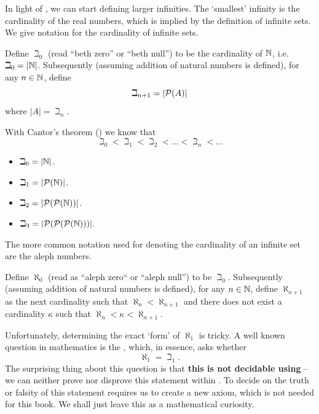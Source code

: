 In light of , we can start defining larger infinities. The `smallest' infinity is the cardinality of the real numbers, which is implied by the definition of infinite sets. We give notation for the cardinality of infinite sets.

\begin{definition}
    Define $\beth_0$ (read ``beth zero'' or ``beth null'') to be the cardinality of $\mathbb{N}$, i.e. $\beth_0 = |\mathbb{N}|$. Subsequently (assuming addition of natural numbers is defined), for any $n \in \mathbb{N}$, define
    \[
        \beth_{n+1} = |{\mathcal{P}(A)}|
    \]
    where $|A| = \beth_n$.
\end{definition}

With Cantor's theorem () we know that
\[
    \beth_0 < \beth_1 < \beth_2 < \dots < \beth_n < \dots
\]

\begin{example}
    \begin{itemize}[leftmargin=*]
        \item $\beth_0 = |\mathbb{N}|$.
        \item $\beth_1 = |{\mathcal{P}(\mathbb{N})}|$.
        \item $\beth_2 = |{\mathcal{P}({\mathcal{P}(\mathbb{N})})}|$.
        \item $\beth_3 = |{\mathcal{P}({\mathcal{P}({\mathcal{P}(\mathbb{N})})})}|$.
    \end{itemize}
\end{example}

The more common notation used for denoting the cardinality of an infinite set are the aleph numbers.

\begin{definition}
    Define $\aleph_0$ (read as ``aleph zero`` or ``aleph null'') to be $\beth_0$. Subsequently (assuming addition of natural numbers is defined), for any $n \in \mathbb{N}$, define $\aleph_{n+1}$ as the next cardinality such that $\aleph_n < \aleph_{n+1}$ and there does not exist a cardinality $\kappa$ such that $\aleph_n < \kappa < \aleph_{n+1}$.
\end{definition}

Unfortunately, determining the exact `form' of $\aleph_1$ is tricky. A well known question in mathematics is the , which, in essence, asks whether
\[
    \aleph_1 = \beth_1.
\]
The surprising thing about this question is that \textbf{this is not decidable using \ZFC} -- we can neither prove nor disprove this statement within \ZFC. To decide on the truth or falsity of this statement requires us to create a new axiom, which is not needed for this book. We shall just leave this as a mathematical curiosity.

